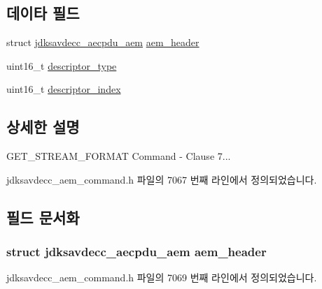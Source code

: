 \subsection*{데이타 필드}
\begin{DoxyCompactItemize}
\item 
struct \hyperlink{structjdksavdecc__aecpdu__aem}{jdksavdecc\+\_\+aecpdu\+\_\+aem} \hyperlink{structjdksavdecc__aem__command__get__stream__format_ae1e77ccb75ff5021ad923221eab38294}{aem\+\_\+header}
\item 
uint16\+\_\+t \hyperlink{structjdksavdecc__aem__command__get__stream__format_ab7c32b6c7131c13d4ea3b7ee2f09b78d}{descriptor\+\_\+type}
\item 
uint16\+\_\+t \hyperlink{structjdksavdecc__aem__command__get__stream__format_a042bbc76d835b82d27c1932431ee38d4}{descriptor\+\_\+index}
\end{DoxyCompactItemize}


\subsection{상세한 설명}
G\+E\+T\+\_\+\+S\+T\+R\+E\+A\+M\+\_\+\+F\+O\+R\+M\+AT Command -\/ Clause 7... 

jdksavdecc\+\_\+aem\+\_\+command.\+h 파일의 7067 번째 라인에서 정의되었습니다.



\subsection{필드 문서화}
\subsubsection[{\texorpdfstring{aem\+\_\+header}{aem_header}}]{\setlength{\rightskip}{0pt plus 5cm}struct {\bf jdksavdecc\+\_\+aecpdu\+\_\+aem} aem\+\_\+header}\hypertarget{structjdksavdecc__aem__command__get__stream__format_ae1e77ccb75ff5021ad923221eab38294}{}\label{structjdksavdecc__aem__command__get__stream__format_ae1e77ccb75ff5021ad923221eab38294}


jdksavdecc\+\_\+aem\+\_\+command.\+h 파일의 7069 번째 라인에서 정의되었습니다.

